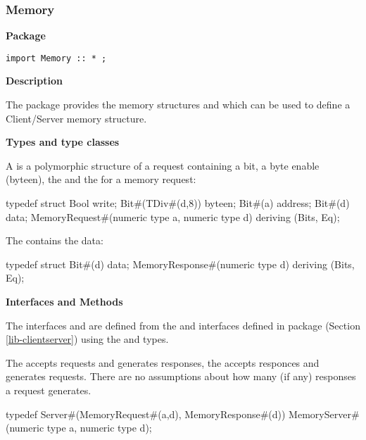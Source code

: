 \subsubsection{Memory}
\label{sec-Memory}


{\bf Package}

\begin{verbatim}
import Memory :: * ;
\end{verbatim}

{\bf Description}

The  package provides the memory structures
 and  which can be used to define
a Client/Server memory structure.

{\bf Types and type classes}

A  is a polymorphic structure of a request
containing a  bit, a byte enable (byteen), the  and
the  for a memory request:

\begin{libverbatim}
typedef struct {
   Bool    write;
   Bit#(TDiv#(d,8)) byteen;
   Bit#(a) address;
   Bit#(d) data;
} MemoryRequest#(numeric type a, numeric type d) deriving (Bits, Eq);
\end{libverbatim}

The  contains the data:

\begin{libverbatim}
typedef struct {
   Bit#(d)          data;
} MemoryResponse#(numeric type d) deriving (Bits, Eq);
\end{libverbatim}


{\bf Interfaces and Methods}

The interfaces  and  are defined
from the  and  interfaces defined in
 package (Section
\ref{lib-clientserver}) using the
 and  types.

The  accepts requests and generates responses, the 
accepts responces and generates requests.
There are no assumptions about how many (if any) responses
a request  generates.  

\begin{libverbatim}
typedef Server#(MemoryRequest#(a,d), MemoryResponse#(d))  
                MemoryServer#(numeric type a, numeric type d);
\end{libverbatim}


